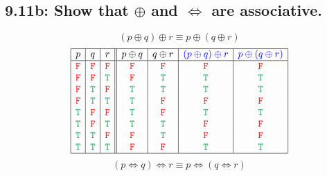 \documentclass{article}
\begin{document}
\subsection*{9.11b: Show that $\oplus$ and $\Leftrightarrow$ are associative.}
\[(p\oplus q)\oplus r\equiv p\oplus(q\oplus r)\]
\[\begin{array}{|c|c|c||c|c|c|c|}
\hline
p&q&r&p\oplus q&q\oplus r&\textcolor{blue}{(p\oplus q)\oplus r}&\textcolor{blue}{p\oplus(q\oplus r)}\\
\hline
\textcolor{red}{\tt{F}}&\textcolor{red}{\tt{F}}&\textcolor{red}{\tt{F}}&\textcolor{red}{\tt{F}}&\textcolor{red}{\tt{F}}&\textcolor{red}{\tt{F}}&\textcolor{red}{\tt{F}}\\
\textcolor{red}{\tt{F}}&\textcolor{red}{\tt{F}}&\textcolor{ForestGreen}{\tt{T}}&\textcolor{red}{\tt{F}}&\textcolor{ForestGreen}{\tt{T}}&\textcolor{ForestGreen}{\tt{T}}&\textcolor{ForestGreen}{\tt{T}}\\
\textcolor{red}{\tt{F}}&\textcolor{ForestGreen}{\tt{T}}&\textcolor{red}{\tt{F}}&\textcolor{ForestGreen}{\tt{T}}&\textcolor{ForestGreen}{\tt{T}}&\textcolor{ForestGreen}{\tt{T}}&\textcolor{ForestGreen}{\tt{T}}\\
\textcolor{red}{\tt{F}}&\textcolor{ForestGreen}{\tt{T}}&\textcolor{ForestGreen}{\tt{T}}&\textcolor{ForestGreen}{\tt{T}}&\textcolor{red}{\tt{F}}&\textcolor{red}{\tt{F}}&\textcolor{red}{\tt{F}}\\
\textcolor{ForestGreen}{\tt{T}}&\textcolor{red}{\tt{F}}&\textcolor{red}{\tt{F}}&\textcolor{ForestGreen}{\tt{T}}&\textcolor{red}{\tt{F}}&\textcolor{ForestGreen}{\tt{T}}&\textcolor{ForestGreen}{\tt{T}}\\
\textcolor{ForestGreen}{\tt{T}}&\textcolor{red}{\tt{F}}&\textcolor{ForestGreen}{\tt{T}}&\textcolor{ForestGreen}{\tt{T}}&\textcolor{ForestGreen}{\tt{T}}&\textcolor{red}{\tt{F}}&\textcolor{red}{\tt{F}}\\
\textcolor{ForestGreen}{\tt{T}}&\textcolor{ForestGreen}{\tt{T}}&\textcolor{red}{\tt{F}}&\textcolor{red}{\tt{F}}&\textcolor{ForestGreen}{\tt{T}}&\textcolor{red}{\tt{F}}&\textcolor{red}{\tt{F}}\\
\textcolor{ForestGreen}{\tt{T}}&\textcolor{ForestGreen}{\tt{T}}&\textcolor{ForestGreen}{\tt{T}}&\textcolor{red}{\tt{F}}&\textcolor{red}{\tt{F}}&\textcolor{ForestGreen}{\tt{T}}&\textcolor{ForestGreen}{\tt{T}}\\
\hline
\end{array}\]
\[(p\Leftrightarrow q)\Leftrightarrow r\equiv p\Leftrightarrow(q\Leftrightarrow r)\]
\end{document}
